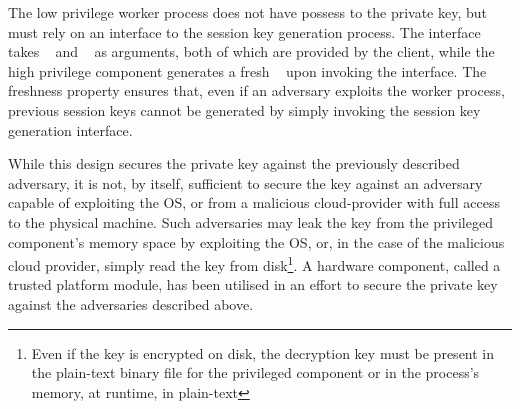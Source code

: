 \documentclass[../main.tex]{subfiles}
\begin{document}
The low privilege worker process does not have possess to the private
key, but must rely on an interface to the session key generation
process. The interface takes \crandom~ and \premaster~ as arguments,
both of which are provided by the client, while the high privilege
component generates a fresh \srandom~ upon invoking the interface. The
freshness property ensures that, even if an adversary exploits the
worker process, previous session keys cannot be generated by simply
invoking the session key generation interface.

While this design secures the private key against the previously
described adversary, it is not, by itself, sufficient to secure the
key against an adversary capable of exploiting the OS, or from a
malicious cloud-provider with full access to the physical
machine. Such adversaries may leak the key from the privileged
component's memory space by exploiting the OS, or, in the case of the
malicious cloud provider, simply read the key from disk\footnote{Even
  if the key is encrypted on disk, the decryption key must be present
  in the plain-text binary file for the privileged component or in the
  process's memory, at runtime, in plain-text}.  A hardware component,
called a trusted platform module, has been utilised in an effort to
secure the private key against the adversaries described above.
\end{document}

